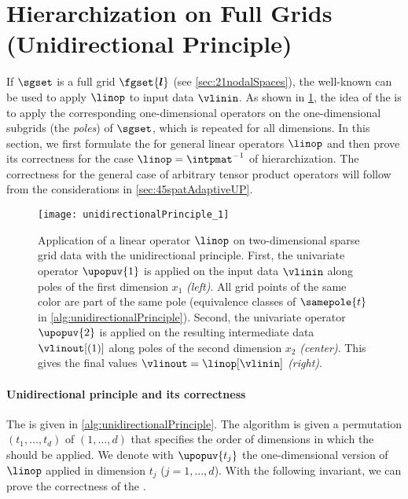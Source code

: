 \section{Hierarchization on Full Grids (Unidirectional Principle)}
\label{sec:42fullGrids}

If $\sgset$ is a full grid $\fgset{\*l}$
(see \cref{sec:21nodalSpaces}),
the well-known \emph{\up}
can be used to apply $\linop$ to input data $\vlinin$.
As shown in \cref{fig:unidirectionalPrinciple}, the idea of the \up
is to apply the corresponding one-dimensional operators on the
one-dimensional subgrids (the \emph{poles}) of $\sgset$,
which is repeated for all dimensions.
In this section, we first formulate the \up for
general linear operators $\linop$ and then prove its correctness for
the case $\linop = \intpmat^{-1}$ of hierarchization.
The correctness for the general case of arbitrary tensor product operators
will follow from the considerations in \cref{sec:45spatAdaptiveUP}.

\begin{figure}
  \texttt{[image: unidirectionalPrinciple\_1]}%
  \caption[%
    Unidirectional principle%
  ]{%
    Application of a linear operator $\linop$
    on two-dimensional sparse grid data with the unidirectional principle.
    First, the univariate operator $\upopuv{1}$ is applied on
    the input data $\vlinin$
    along poles of the first dimension $x_1$ \emph{(left)}.
    All grid points of the same color are part of the same pole
    (equivalence classes of $\samepole{t}$ in
    \cref{alg:unidirectionalPrinciple}).
    Second, the univariate operator $\upopuv{2}$ is applied on the
    resulting intermediate data $\vlinout[(1)]$
    along poles of the second dimension $x_2$ \emph{(center)}.
    This gives the final values $\vlinout = \linop[\vlinin]$ \emph{(right)}.%
  }%
  \label{fig:unidirectionalPrinciple}%
\end{figure}

\paragraph{Unidirectional principle and its correctness}

The \up is given in \cref{alg:unidirectionalPrinciple}.
The algorithm is given a permutation $(t_1, \dotsc, t_d)$ of $(1, \dotsc, d)$
that specifies the order of dimensions in which the \up should be applied.
We denote with $\upopuv{t_j}$ the one-dimensional version of $\linop$
applied in dimension $t_j$ ($j = 1, \dotsc, d$).
With the following invariant, we can prove the correctness of the \up.

